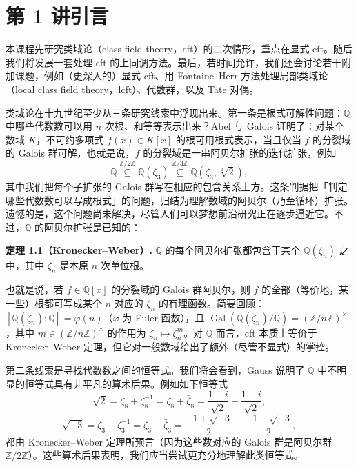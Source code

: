 
\section*{第 1 讲\quad 引言}

本课程先研究类域论（class field theory，cft）的二次情形，重点在显式 cft。随后我们将发展一套处理 cft 的上同调方法。最后，若时间允许，我们还会讨论若干附加课题，例如（更深入的）显式 cft、用 Fontaine--Herr 方法处理局部类域论（local class field theory，lcft）、代数群，以及 Tate 对偶。

类域论在十九世纪至少从三条研究线索中浮现出来。第一条是根式可解性问题：$\mathbb{Q}$ 中哪些代数数可以用 $n$ 次根、和等等表示出来？Abel 与 Galois 证明了：对某个数域 $K$，不可约多项式 $f(x)\in K[x]$ 的根可用根式表示，当且仅当 $f$ 的分裂域的 Galois 群可解，也就是说，$f$ 的分裂域是一串阿贝尔扩张的迭代扩张，例如
\[
  \mathbb{Q}\overset{\mathbb{Z}/2\mathbb{Z}}{\subseteq}\mathbb{Q}(\zeta_3)
  \overset{\mathbb{Z}/3\mathbb{Z}}{\subseteq}\mathbb{Q}(\zeta_3,\sqrt[3]{2}),
\]
其中我们把每个子扩张的 Galois 群写在相应的包含关系上方。这条判据把「判定哪些代数数可以写成根式」的问题，归结为理解数域的阿贝尔（乃至循环）扩张。遗憾的是，这个问题尚未解决，尽管人们可以梦想前沿研究正在逐步逼近它。不过，$\mathbb{Q}$ 的阿贝尔扩张是已知的：

\textbf{定理 1.1（Kronecker--Weber）.} $\mathbb{Q}$ 的每个阿贝尔扩张都包含于某个 $\mathbb{Q}(\zeta_n)$ 之中，其中 $\zeta_n$ 是本原 $n$ 次单位根。

也就是说，若 $f\in\mathbb{Q}[x]$ 的分裂域的 Galois 群阿贝尔，则 $f$ 的全部（等价地，某一些）根都可写成某个 $n$ 对应的 $\zeta_n$ 的有理函数。简要回顾：$[\mathbb{Q}(\zeta_n):\mathbb{Q}]=\varphi(n)$（$\varphi$ 为 Euler 函数），且 $\operatorname{Gal}(\mathbb{Q}(\zeta_n)/\mathbb{Q})=(\mathbb{Z}/n\mathbb{Z})^{\times}$，其中 $m\in(\mathbb{Z}/n\mathbb{Z})^{\times}$ 的作用为 $\zeta_n\mapsto\zeta_n^m$。对 $\mathbb{Q}$ 而言，cft 本质上等价于 Kronecker--Weber 定理，但它对一般数域给出了额外（尽管不显式）的掌控。

第二条线索是寻找代数数之间的恒等式。我们将会看到，Gauss 说明了 $\mathbb{Q}$ 中不明显的恒等式具有非平凡的算术后果。例如如下恒等式
\[
  \sqrt{2}=\zeta_8+\zeta_8^{-1}=\zeta_8+\bar\zeta_8=\frac{1+i}{\sqrt{2}}+\frac{1-i}{\sqrt{2}},
\]
\[
  \sqrt{-3}=\zeta_3-\zeta_3^{-1}=\zeta_3-\bar\zeta_3=\frac{-1+\sqrt{-3}}{2}-\frac{-1-\sqrt{-3}}{2},
\]
都由 Kronecker--Weber 定理所预言（因为这些数对应的 Galois 群是阿贝尔群 $\mathbb{Z}/2\mathbb{Z}$）。这些算术后果表明，我们应当尝试更充分地理解此类恒等式。

